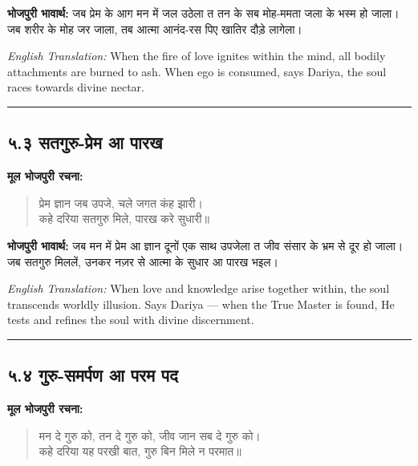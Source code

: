 \textbf{भोजपुरी भावार्थ:} जब प्रेम के आग मन में जल उठेला त तन के सब मोह-ममता जला के भस्म हो जाला। जब शरीर के मोह जर जाला, तब आत्मा आनंद-रस पिए खातिर दौड़े लागेला।

\begin{sloppypar}
{\engfont \textit{English Translation:} When the fire of love ignites within the mind, all bodily attachments are burned to ash.
When ego is consumed, says Dariya, the soul races towards divine nectar.}
\end{sloppypar}

\begin{center}
{\color{bordercolor}\rule{0.4\textwidth}{0.4pt}}
\end{center}

\subsection*{५.३ सतगुरु-प्रेम आ पारख}

\textbf{मूल भोजपुरी रचना:}

\begin{quote}
प्रेम ज्ञान जब उपजे, चले जगत कंह झारी।\\
कहे दरिया सतगुरु मिले, पारख करे सुधारी॥
\end{quote}

\textbf{भोजपुरी भावार्थ:} जब मन में प्रेम आ ज्ञान दूनों एक साथ उपजेला त जीव संसार के भ्रम से दूर हो जाला। जब सतगुरु मिललें, उनकर नज़र से आत्मा के सुधार आ पारख भइल।

\begin{sloppypar}
{\engfont \textit{English Translation:} When love and knowledge arise together within, the soul transcends worldly illusion.
Says Dariya --- when the True Master is found, He tests and refines the soul with divine discernment.}
\end{sloppypar}

\begin{center}
{\color{bordercolor}\rule{0.4\textwidth}{0.4pt}}
\end{center}

\subsection*{५.४ गुरु-समर्पण आ परम पद}

\textbf{मूल भोजपुरी रचना:}

\begin{quote}
मन दे गुरु को, तन दे गुरु को, जीव जान सब दे गुरु को।\\
कहे दरिया यह परखी बात, गुरु बिन मिले न परमात॥
\end{quote}

